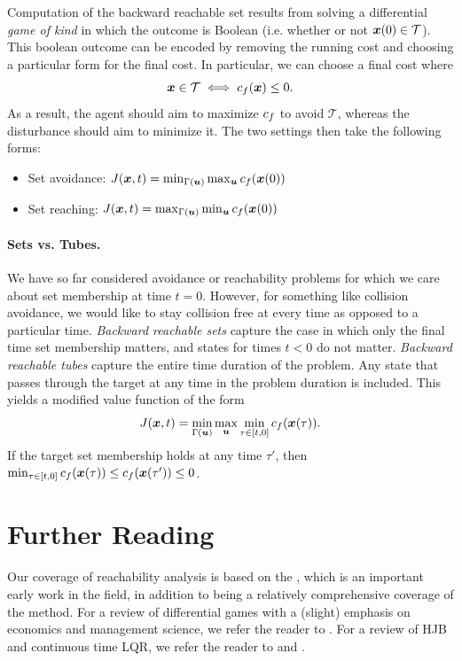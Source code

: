 Computation of the backward reachable set results from solving a differential \textit{game of kind} in which the outcome is Boolean (i.e. whether or not $\bm{x}(0) \in \mathcal{T}$). This boolean outcome can be encoded by removing the running cost and choosing a particular form for the final cost. In particular, we can choose a final cost where
\begin{equation}
    \bm{x} \in \mathcal{T} \iff c_f(\bm{x}) \leq 0.
\end{equation}
As a result, the agent should aim to maximize $c_f$ to avoid $\mathcal{T}$, whereas the disturbance should aim to minimize it. The two settings then take the following forms:
\begin{itemize}
    \item Set avoidance: $J(\bm{x},t) = \min_{\Gamma(\bm{u})} \max_{\bm{u}} c_f(\bm{x}(0))$
    \item Set reaching: $J(\bm{x},t) = \max_{\Gamma(\bm{u})} \min_{\bm{u}} c_f(\bm{x}(0))$
\end{itemize}

\paragraph{Sets vs. Tubes.} We have so far considered avoidance or reachability problems for which we care about set membership at time $t=0$. However, for something like collision avoidance, we would like to stay collision free at every time as opposed to a particular time. \textit{Backward reachable sets} capture the case in which only the final time set membership matters, and states for times $t<0$ do not matter. \textit{Backward reachable tubes} capture the entire time duration of the problem. Any state that passes through the target at any time in the problem duration is included. This yields a modified value function of the form
\begin{equation}
    J(\bm{x},t) = \min_{\Gamma(\bm{u})} \max_{\bm{u}} \min_{\tau \in [t,0]} c_f(\bm{x}(\tau)).
\end{equation}
If the target set membership holds at any time $\tau'$, then $\min_{\tau\in[t,0]} c_f(\bm{x}(\tau)) \leq c_f(\bm{x}(\tau')) \leq 0$.

\section{Further Reading}

Our coverage of reachability analysis is based on the \cite{mitchell2005time}, which is an important early work in the field, in addition to being a relatively comprehensive coverage of the method. For a review of differential games with a (slight) emphasis on economics and management science, we refer the reader to \cite{bressan2010noncooperative}. For a review of HJB and continuous time LQR, we refer the reader to \cite{bertsekas1995dynamic} and \cite{kirk2012optimal}.

